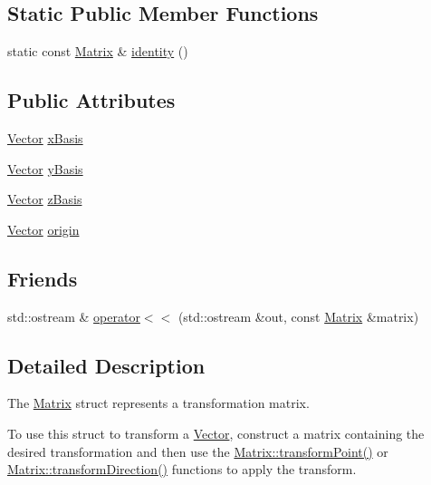 \subsection*{Static Public Member Functions}
\begin{DoxyCompactItemize}
\item 
static const \hyperlink{struct_leap_1_1_matrix}{Matrix} \& \hyperlink{struct_leap_1_1_matrix_abd8dff1c625a2c21ea01536335334183}{identity} ()
\end{DoxyCompactItemize}
\subsection*{Public Attributes}
\begin{DoxyCompactItemize}
\item 
\hyperlink{struct_leap_1_1_vector}{Vector} \hyperlink{struct_leap_1_1_matrix_a9e5e56926e88315a309007843860eced}{x\+Basis}
\item 
\hyperlink{struct_leap_1_1_vector}{Vector} \hyperlink{struct_leap_1_1_matrix_ad13e4c2baa3681ee9b92faf9da33b19b}{y\+Basis}
\item 
\hyperlink{struct_leap_1_1_vector}{Vector} \hyperlink{struct_leap_1_1_matrix_a62c45d9b2370027de27781fadcfc13d8}{z\+Basis}
\item 
\hyperlink{struct_leap_1_1_vector}{Vector} \hyperlink{struct_leap_1_1_matrix_a64cc576f42312999153c26b6b558fb9d}{origin}
\end{DoxyCompactItemize}
\subsection*{Friends}
\begin{DoxyCompactItemize}
\item 
std\+::ostream \& \hyperlink{struct_leap_1_1_matrix_a5e736a2de52898e1930820f93bfdfba4}{operator$<$$<$} (std\+::ostream \&out, const \hyperlink{struct_leap_1_1_matrix}{Matrix} \&matrix)
\end{DoxyCompactItemize}


\subsection{Detailed Description}
The \hyperlink{struct_leap_1_1_matrix}{Matrix} struct represents a transformation matrix.

To use this struct to transform a \hyperlink{struct_leap_1_1_vector}{Vector}, construct a matrix containing the desired transformation and then use the \hyperlink{struct_leap_1_1_matrix_afabbef88d8949e98a86e97bab3451325}{Matrix\+::transform\+Point()} or \hyperlink{struct_leap_1_1_matrix_a9c0e8a9d20bda205de7cfc3165bdac17}{Matrix\+::transform\+Direction()} functions to apply the transform.

